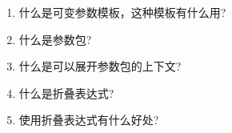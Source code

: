 \begin{enumerate}
\item
什么是可变参数模板，这种模板有什么用?

\item
什么是参数包?

\item
什么是可以展开参数包的上下文?

\item
什么是折叠表达式?

\item
使用折叠表达式有什么好处?
\end{enumerate}